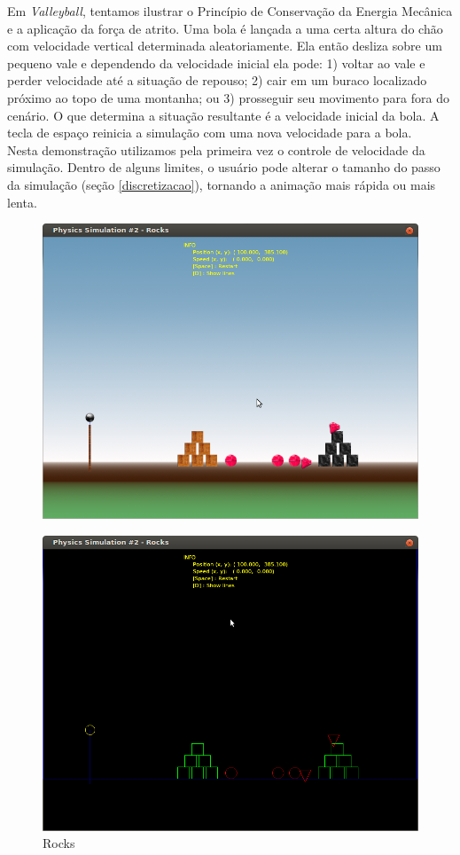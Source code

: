 Em \textit{Valleyball}, tentamos ilustrar o Princípio de Conservação da Energia Mecânica e a aplicação da força de atrito. Uma bola é lançada a uma certa altura do chão com velocidade vertical determinada aleatoriamente. Ela então desliza sobre um pequeno vale e dependendo da velocidade inicial ela pode: 1) voltar ao vale e perder velocidade até a situação de repouso; 2) cair em um buraco localizado próximo ao topo de uma montanha; ou 3) prosseguir seu movimento para fora do cenário. O que determina a situação resultante é a velocidade inicial da bola. A tecla de espaço reinicia a simulação com uma nova velocidade para a bola. \\

Nesta demonstração utilizamos pela primeira vez o controle de velocidade da simulação. Dentro de alguns limites, o usuário pode alterar o tamanho do passo da simulação (seção \ref{discretizacao}), tornando a animação mais rápida ou mais lenta. \\

\begin{figure}[H]
\centering
  \includegraphics[scale=0.4]{images/rocks.png}
\end{figure}
\begin{figure}[H]
\centering
  \includegraphics[scale=0.4]{images/rocksE.png}
  \caption{Rocks}
\end{figure}

